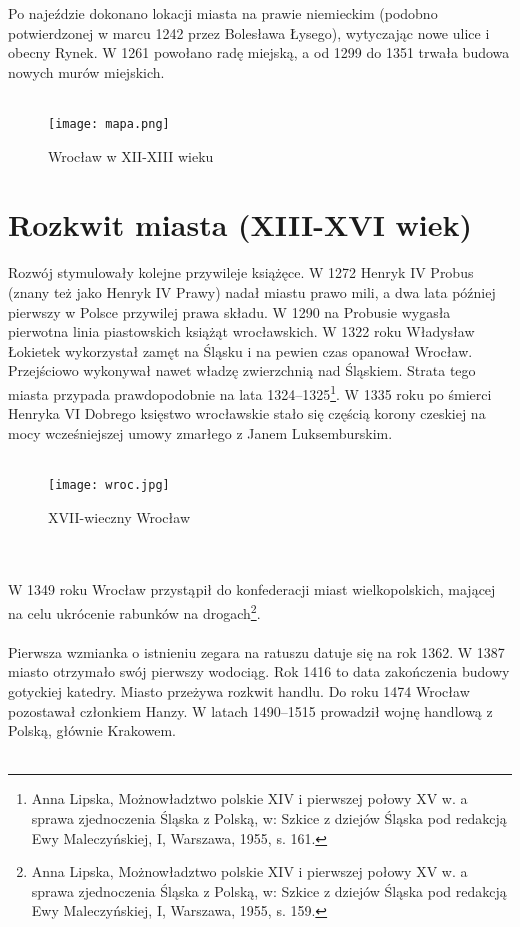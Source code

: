 \documentclass[12pt]{article}
\begin{document}
Po najeździe dokonano lokacji miasta na prawie niemieckim (podobno potwierdzonej w marcu 1242 przez Bolesława Łysego), wytyczając nowe ulice i obecny Rynek. W 1261 powołano radę miejską, a od 1299 do 1351 trwała budowa nowych murów miejskich.\\\\
\begin{figure}[h]
      \centering
      \texttt{[image: mapa.png]}
      \caption{Wrocław w XII-XIII wieku}
      \label{fig:mapa}
\end{figure}

\section{Rozkwit miasta (XIII-XVI wiek)}

Rozwój stymulowały kolejne przywileje książęce. W 1272 Henryk IV Probus (znany też jako Henryk IV Prawy) nadał miastu prawo mili, a dwa lata później pierwszy w Polsce przywilej prawa składu. W 1290 na Probusie wygasła pierwotna linia piastowskich książąt wrocławskich. W 1322 roku Władysław Łokietek wykorzystał zamęt na Śląsku i na pewien czas opanował Wrocław. Przejściowo wykonywał nawet władzę zwierzchnią nad Śląskiem. Strata tego miasta przypada prawdopodobnie na lata 1324–1325\footnote{Anna Lipska, Możnowładztwo polskie XIV i pierwszej połowy XV w. a sprawa zjednoczenia Śląska z Polską, w: Szkice z dziejów Śląska pod redakcją Ewy Maleczyńskiej, I, Warszawa, 1955, s. 161.}. W 1335 roku po śmierci Henryka VI Dobrego księstwo wrocławskie stało się częścią korony czeskiej na mocy wcześniejszej umowy zmarłego z Janem Luksemburskim.\\\\
\begin{figure}[h]
    \centering
    \texttt{[image: wroc.jpg]}
    \caption{XVII-wieczny Wrocław}
    \label{fig:wroc}
\end{figure}\\\\
W 1349 roku Wrocław przystąpił do konfederacji miast wielkopolskich, mającej na celu ukrócenie rabunków na drogach\footnote{Anna Lipska, Możnowładztwo polskie XIV i pierwszej połowy XV w. a sprawa zjednoczenia Śląska z Polską, w: Szkice z dziejów Śląska pod redakcją Ewy Maleczyńskiej, I, Warszawa, 1955, s. 159.}.\\\\
Pierwsza wzmianka o istnieniu zegara na ratuszu datuje się na rok 1362. W 1387 miasto otrzymało swój pierwszy wodociąg. Rok 1416 to data zakończenia budowy gotyckiej katedry. Miasto przeżywa rozkwit handlu. Do roku 1474 Wrocław pozostawał członkiem Hanzy. W latach 1490–1515 prowadził wojnę handlową z Polską, głównie Krakowem.\\\\
\end{document}

